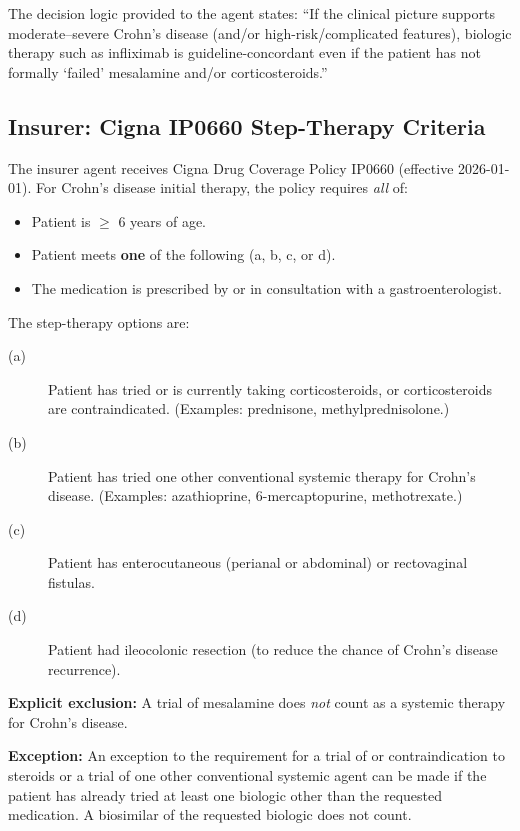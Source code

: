 The decision logic provided to the agent states: ``If the clinical picture supports moderate--severe Crohn's disease (and/or high-risk/complicated features), biologic therapy such as infliximab is guideline-concordant even if the patient has not formally `failed' mesalamine and/or corticosteroids.''

\subsection{Insurer: Cigna IP0660 Step-Therapy Criteria}

The insurer agent receives Cigna Drug Coverage Policy IP0660 (effective 2026-01-01). For Crohn's disease initial therapy, the policy requires \emph{all} of:
\begin{itemize}
    \item Patient is $\geq$ 6 years of age.
    \item Patient meets \textbf{one} of the following (a, b, c, or d).
    \item The medication is prescribed by or in consultation with a gastroenterologist.
\end{itemize}

The step-therapy options are:
\begin{description}
    \item[(a)] Patient has tried or is currently taking corticosteroids, or corticosteroids are contraindicated. (Examples: prednisone, methylprednisolone.)
    \item[(b)] Patient has tried one other conventional systemic therapy for Crohn's disease. (Examples: azathioprine, 6-mercaptopurine, methotrexate.)
    \item[(c)] Patient has enterocutaneous (perianal or abdominal) or rectovaginal fistulas.
    \item[(d)] Patient had ileocolonic resection (to reduce the chance of Crohn's disease recurrence).
\end{description}

\noindent\textbf{Explicit exclusion:} A trial of mesalamine does \emph{not} count as a systemic therapy for Crohn's disease.

\noindent\textbf{Exception:} An exception to the requirement for a trial of or contraindication to steroids or a trial of one other conventional systemic agent can be made if the patient has already tried at least one biologic other than the requested medication. A biosimilar of the requested biologic does not count.

